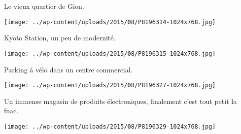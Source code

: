  Le vieux quartier de Gion.
\begin{center} \texttt{[image: ../wp-content/uploads/2015/08/P8196314-1024x768.jpg]} \end{center}
\vspace{-\topsep}
\pagebreak
 
 Kyoto Station, un peu de modernité.
\begin{center} \texttt{[image: ../wp-content/uploads/2015/08/P8196315-1024x768.jpg]} \end{center}

 Parking à vélo dans un centre commercial.
\begin{center} \texttt{[image: ../wp-content/uploads/2015/08/P8196327-1024x768.jpg]} \end{center}
\vspace{-\topsep}
\pagebreak
 
 Un immense magasin de produits électroniques, finalement c'est tout petit la fnac. 
 \vspace{1.75mm}
\begin{center} \texttt{[image: ../wp-content/uploads/2015/08/P8196329-1024x768.jpg]} \end{center}
